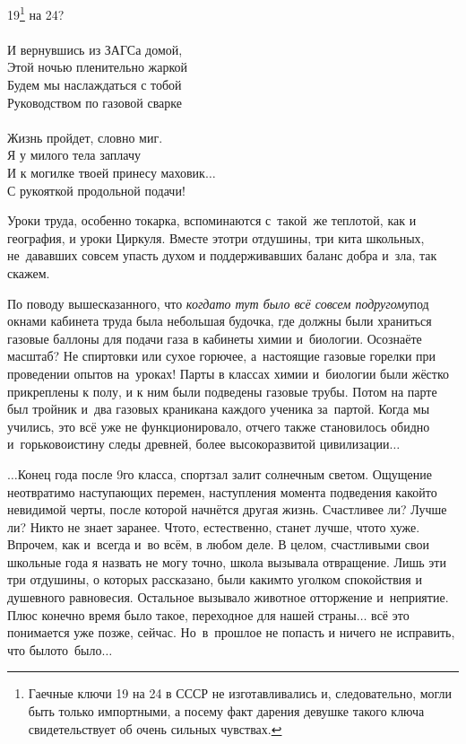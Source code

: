 {\hspace*{2.7cm}19\footnote{Гаечные ключи 19 на 24 в СССР не изготавливались и, следовательно, могли быть только импортными, а посему факт дарения девушке такого ключа свидетельствует об очень сильных чувствах.} на 24?\\
\\
\hspace*{2.7cm}И вернувшись из ЗАГСа домой,\\
\hspace*{2.7cm}Этой ночью пленительно жаркой\\
\hspace*{2.7cm}Будем мы наслаждаться с тобой\\
\hspace*{2.7cm}Руководством по газовой сварке\\
\\
\hspace*{2.7cm}Жизнь пройдет, словно миг.\\
\hspace*{2.7cm}Я у милого тела заплачу\\
\hspace*{2.7cm}И к могилке твоей принесу маховик$\ldots$\\
\hspace*{2.7cm}С рукояткой продольной подачи!\\ 
}
\vspace{0.1cm}

Уроки труда, особенно токарка, вспоминаются с~такой~же теплотой, как и география, и уроки Циркуля. Вместе это\mdash три отдушины, три кита школьных, не~дававших совсем упасть духом и поддерживавших баланс добра и~зла, так скажем. 

По поводу вышесказанного, что \textit{когда\sdash то тут было всё совсем по\sdash другому}\mdash под окнами кабинета труда была небольшая будочка, где должны были храниться газовые баллоны для подачи газа в кабинеты химии и~биологии. Осознаёте масштаб? Не спиртовки или сухое горючее, а~настоящие газовые горелки при проведении опытов на~уроках! Парты в классах химии и~биологии были жёстко прикреплены к полу, и к ним были подведены газовые трубы. Потом на парте был тройник и~два газовых краника\mdash на каждого ученика за~партой. Когда мы учились, это всё уже не функционировало, отчего также становилось обидно и~горько\mdash воистину следы древней, более высокоразвитой цивилизации$\ldots$

$\ldots$Конец года после 9\sdash го класса, спортзал залит солнечным светом. Ощущение неотвратимо наступающих перемен, наступления момента подведения какой\sdash то невидимой черты, после которой начнётся другая жизнь. Счастливее ли? Лучше ли? Никто не знает заранее. Что\sdash то, естественно, станет лучше, что\sdash то хуже. Впрочем, как и~всегда и~во всём, в любом деле. В целом, счастливыми свои школьные года я назвать не могу точно, школа вызывала отвращение. Лишь эти три отдушины, о которых рассказано, были каким\sdash то уголком спокойствия и душевного равновесия. Остальное вызывало животное отторжение и~неприятие. Плюс конечно время было такое, переходное для нашей страны$\ldots$ всё это понимается уже позже, сейчас. Но~в~прошлое не попасть и ничего не исправить, что было\mdash то~было$\ldots$  

\begin{center}
\end{center}
